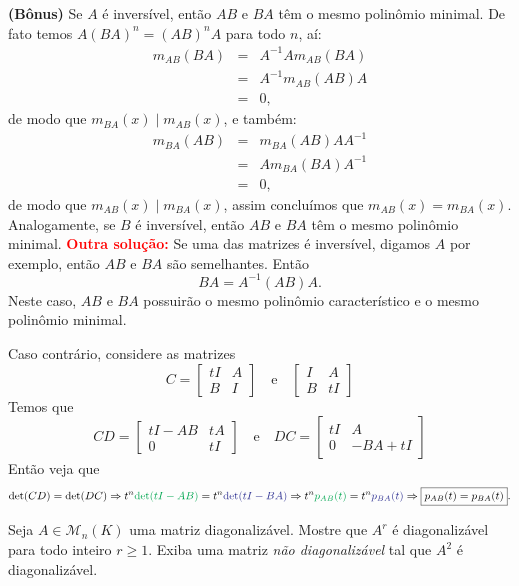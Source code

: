\documentclass[11pt,a4paper]{article}
\begin{document}
{{\task[\pers{d}] \textbf{(Bônus)} Se $A$ é inversível, então $AB$ e $BA$ têm o mesmo polinômio minimal. De fato temos $A(BA)^n=(AB)^nA$ para todo $n$, aí:
\[
\begin{array}{rcl}
m_{AB}(BA)&=&A^{-1}Am_{AB}(BA)\\&=&A^{-1}m_{AB}(AB)A\\&=&0,
\end{array}
\]
de modo que $m_{BA}(x)\mid m_{AB}(x)$, e também:
\[
\begin{array}{rcl}
m_{BA}(AB)&=&m_{BA}(AB)AA^{-1}\\&=&Am_{BA}(BA)A^{-1}\\&=&0,
\end{array}
\]
de modo que $m_{AB}(x)\mid m_{BA}(x)$, assim concluímos que $m_{AB}(x)=m_{BA}(x)$. Analogamente, se $B$ é inversível, então $AB$ e $BA$ têm o mesmo polinômio minimal.
}
\textbf{\textcolor{Red}{Outra solução:}} Se uma das matrizes é inversível, digamos $A$ por exemplo, então $AB$ e $BA$ são semelhantes. Então \[BA = A^{-1}(AB)A.\]
Neste caso, $AB$ e $BA$ possuirão o mesmo polinômio característico e o mesmo polinômio minimal.

Caso contrário, considere as matrizes
\[
C = \begin{bmatrix}
tI & A \\ B & I
\end{bmatrix} \quad \mbox{e} \quad \begin{bmatrix}
I & A \\ B & tI
\end{bmatrix}
\]
Temos que
\[
CD =  \begin{bmatrix}
tI-AB & tA \\ 0 & tI
\end{bmatrix}   \quad \mbox{e} \quad DC = \begin{bmatrix}
tI & A \\ 0 & -BA + tI
\end{bmatrix} 
\]
Então veja que
\[
\det(CD) = \det(DC) \Rightarrow t^n \textcolor{Green}{\det(tI - AB)} = t^n \textcolor{Blue}{\det(tI-BA)} \Rightarrow t^n \textcolor{Green}{p_{AB}(t)} = t^n \textcolor{Blue}{p_{BA}(t)} \Rightarrow \boxed{p_{AB}(t) = p_{BA}(t)}.
\]
}

 Seja $A \in \mathcal{M}_n(K)$ uma matriz diagonalizável. Mostre que $A^r$ é diagonalizável para todo inteiro $r \ge 1.$ Exiba uma matriz \emph{não diagonalizável} tal que $A^2$ é diagonalizável.
\end{document}
